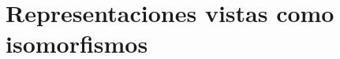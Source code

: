 \documentclass[notasLineal]{subfiles}
\begin{document}
\section{Representaciones vistas como isomorfismos}\label{Sec: Representaciones vistas como isomorfismos}
\end{document}

